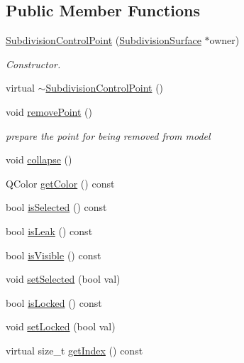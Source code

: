 \subsection*{Public Member Functions}
\begin{DoxyCompactItemize}
\item 
\hyperlink{classShipCAD_1_1SubdivisionControlPoint_a812f4e2343926ef41bc7104f0f7b1dd9}{Subdivision\+Control\+Point} (\hyperlink{classShipCAD_1_1SubdivisionSurface}{Subdivision\+Surface} $\ast$owner)
\begin{DoxyCompactList}\small\item\em Constructor. \end{DoxyCompactList}\item 
virtual \hyperlink{classShipCAD_1_1SubdivisionControlPoint_a136b303b0e3a10d75a818ceca2878fb9}{$\sim$\+Subdivision\+Control\+Point} ()
\item 
void \hyperlink{classShipCAD_1_1SubdivisionControlPoint_adb75e163fa29e60ffbc30d7bf1005a60}{remove\+Point} ()
\begin{DoxyCompactList}\small\item\em prepare the point for being removed from model \end{DoxyCompactList}\item 
void \hyperlink{classShipCAD_1_1SubdivisionControlPoint_a3c11cf5f0a22b44cbc8674a5d82942b0}{collapse} ()
\item 
Q\+Color \hyperlink{classShipCAD_1_1SubdivisionControlPoint_ab44ade7391aa61a1971990c53ecd20c5}{get\+Color} () const 
\item 
bool \hyperlink{classShipCAD_1_1SubdivisionControlPoint_ad17995b77b12d9a8c37197d3c8460c48}{is\+Selected} () const 
\item 
bool \hyperlink{classShipCAD_1_1SubdivisionControlPoint_aaa6134e9bf93d09dfdc5a1f02b6aaf2d}{is\+Leak} () const 
\item 
bool \hyperlink{classShipCAD_1_1SubdivisionControlPoint_a804539ab78cc9b56d7a65110bc2db294}{is\+Visible} () const 
\item 
void \hyperlink{classShipCAD_1_1SubdivisionControlPoint_a5642f57c7f17e78c27ad6edb0fdb7f65}{set\+Selected} (bool val)
\item 
bool \hyperlink{classShipCAD_1_1SubdivisionControlPoint_a85c52118d96f400be4705bf419b412c6}{is\+Locked} () const 
\item 
void \hyperlink{classShipCAD_1_1SubdivisionControlPoint_a5f2cde3c54ca44c4b4d3ded0e3bc4ded}{set\+Locked} (bool val)
\item 
virtual size\+\_\+t \hyperlink{classShipCAD_1_1SubdivisionControlPoint_ae951af6a17cd9e98383f079d84ae9e2a}{get\+Index} () const 

\end{DoxyCompactItemize}
